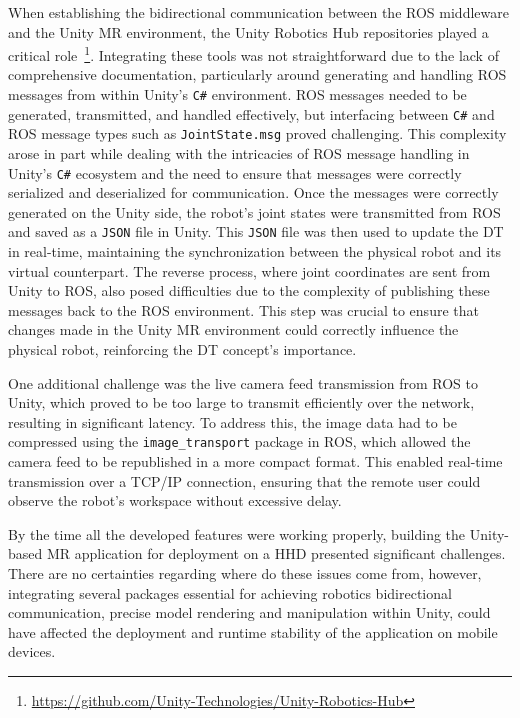 When establishing the bidirectional communication between the \ac{ROS} middleware and the Unity \ac{MR} environment, the Unity Robotics Hub repositories played a critical role~\footnote{\url{https://github.com/Unity-Technologies/Unity-Robotics-Hub}}. Integrating these tools was not straightforward due to the lack of comprehensive documentation, particularly around generating and handling \ac{ROS} messages from within Unity’s \texttt{C\#} environment. \ac{ROS} messages needed to be generated, transmitted, and handled effectively, but interfacing between \texttt{C\#} and \ac{ROS} message types such as \texttt{JointState.msg} proved challenging. This complexity arose in part while dealing with the intricacies of \ac{ROS} message handling in Unity’s \texttt{C\#} ecosystem and the need to ensure that messages were correctly serialized and deserialized for communication. Once the messages were correctly generated on the Unity side, the robot's joint states were transmitted from \ac{ROS} and saved as a \texttt{JSON} file in Unity. This \texttt{JSON} file was then used to update the \ac{DT} in real-time, maintaining the synchronization between the physical robot and its virtual counterpart. The reverse process, where joint coordinates are sent from Unity to \ac{ROS}, also posed difficulties due to the complexity of publishing these messages back to the \ac{ROS} environment. This step was crucial to ensure that changes made in the Unity \ac{MR} environment could correctly influence the physical robot, reinforcing the \ac{DT} concept's importance.

One additional challenge was the live camera feed transmission from \ac{ROS} to Unity, which proved to be too large to transmit efficiently over the network, resulting in significant latency. To address this, the image data had to be compressed using the \texttt{image\_transport} package in \ac{ROS}, which allowed the camera feed to be republished in a more compact format. This enabled real-time transmission over a \ac{TCP}/\ac{IP} connection, ensuring that the remote user could observe the robot’s workspace without excessive delay.

By the time all the developed features were working properly, building the Unity-based \ac{MR} application for deployment on a \ac{HHD} presented significant challenges. There are no certainties regarding where do these issues come from, however, integrating several packages essential for achieving robotics bidirectional communication, precise model rendering and manipulation within Unity, could have affected the deployment and runtime stability of the application on mobile devices.

